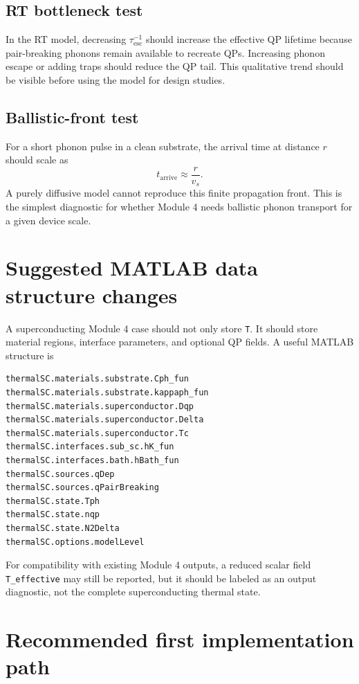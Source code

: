 \documentclass[11pt]{article}
\newcommand{\tauesc}{\tau_{\mathrm{esc}}}
\begin{document}
\subsection{RT bottleneck test}

In the RT model, decreasing \(\tauesc^{-1}\) should increase the effective QP lifetime because pair-breaking phonons remain available to recreate QPs. Increasing phonon escape or adding traps should reduce the QP tail. This qualitative trend should be visible before using the model for design studies.

\subsection{Ballistic-front test}

For a short phonon pulse in a clean substrate, the arrival time at distance \(r\) should scale as
\begin{equation}
t_{\mathrm{arrive}}\approx \frac{r}{v_s}.
\end{equation}
A purely diffusive model cannot reproduce this finite propagation front. This is the simplest diagnostic for whether Module 4 needs ballistic phonon transport for a given device scale.

\section{Suggested MATLAB data structure changes}

A superconducting Module 4 case should not only store \texttt{T}. It should store material regions, interface parameters, and optional QP fields. A useful MATLAB structure is
\begin{verbatim}
thermalSC.materials.substrate.Cph_fun
thermalSC.materials.substrate.kappaph_fun
thermalSC.materials.superconductor.Dqp
thermalSC.materials.superconductor.Delta
thermalSC.materials.superconductor.Tc
thermalSC.interfaces.sub_sc.hK_fun
thermalSC.interfaces.bath.hBath_fun
thermalSC.sources.qDep
thermalSC.sources.qPairBreaking
thermalSC.state.Tph
thermalSC.state.nqp
thermalSC.state.N2Delta
thermalSC.options.modelLevel
\end{verbatim}

For compatibility with existing Module 4 outputs, a reduced scalar field \texttt{T\_effective} may still be reported, but it should be labeled as an output diagnostic, not the complete superconducting thermal state.

\section{Recommended first implementation path}
\end{document}
